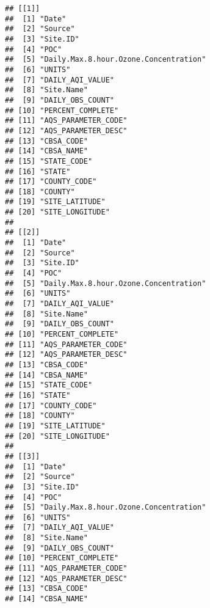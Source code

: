 \documentclass[]{article}
\begin{document}
\begin{verbatim}
## [[1]]
##  [1] "Date"                                
##  [2] "Source"                              
##  [3] "Site.ID"                             
##  [4] "POC"                                 
##  [5] "Daily.Max.8.hour.Ozone.Concentration"
##  [6] "UNITS"                               
##  [7] "DAILY_AQI_VALUE"                     
##  [8] "Site.Name"                           
##  [9] "DAILY_OBS_COUNT"                     
## [10] "PERCENT_COMPLETE"                    
## [11] "AQS_PARAMETER_CODE"                  
## [12] "AQS_PARAMETER_DESC"                  
## [13] "CBSA_CODE"                           
## [14] "CBSA_NAME"                           
## [15] "STATE_CODE"                          
## [16] "STATE"                               
## [17] "COUNTY_CODE"                         
## [18] "COUNTY"                              
## [19] "SITE_LATITUDE"                       
## [20] "SITE_LONGITUDE"                      
## 
## [[2]]
##  [1] "Date"                                
##  [2] "Source"                              
##  [3] "Site.ID"                             
##  [4] "POC"                                 
##  [5] "Daily.Max.8.hour.Ozone.Concentration"
##  [6] "UNITS"                               
##  [7] "DAILY_AQI_VALUE"                     
##  [8] "Site.Name"                           
##  [9] "DAILY_OBS_COUNT"                     
## [10] "PERCENT_COMPLETE"                    
## [11] "AQS_PARAMETER_CODE"                  
## [12] "AQS_PARAMETER_DESC"                  
## [13] "CBSA_CODE"                           
## [14] "CBSA_NAME"                           
## [15] "STATE_CODE"                          
## [16] "STATE"                               
## [17] "COUNTY_CODE"                         
## [18] "COUNTY"                              
## [19] "SITE_LATITUDE"                       
## [20] "SITE_LONGITUDE"                      
## 
## [[3]]
##  [1] "Date"                                
##  [2] "Source"                              
##  [3] "Site.ID"                             
##  [4] "POC"                                 
##  [5] "Daily.Max.8.hour.Ozone.Concentration"
##  [6] "UNITS"                               
##  [7] "DAILY_AQI_VALUE"                     
##  [8] "Site.Name"                           
##  [9] "DAILY_OBS_COUNT"                     
## [10] "PERCENT_COMPLETE"                    
## [11] "AQS_PARAMETER_CODE"                  
## [12] "AQS_PARAMETER_DESC"                  
## [13] "CBSA_CODE"                           
## [14] "CBSA_NAME"                           

\end{verbatim}
\end{document}
